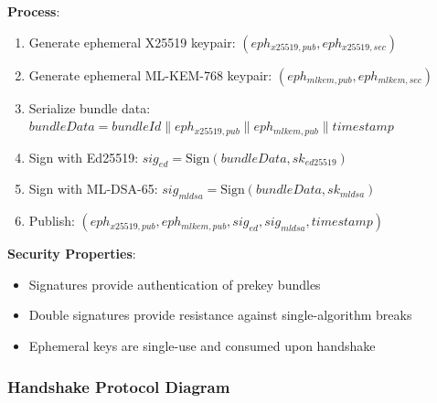 \documentclass[11pt,a4paper,oneside]{article}
\begin{document}
\textbf{Process}:
\begin{enumerate}
\item Generate ephemeral X25519 keypair: $(eph_{x25519,pub}, eph_{x25519,sec})$
\item Generate ephemeral ML-KEM-768 keypair: $(eph_{mlkem,pub}, eph_{mlkem,sec})$
\item Serialize bundle data: $bundleData = bundleId \| eph_{x25519,pub} \| eph_{mlkem,pub} \| timestamp$
\item Sign with Ed25519: $sig_{ed} = \text{Sign}(bundleData, sk_{ed25519})$
\item Sign with ML-DSA-65: $sig_{mldsa} = \text{Sign}(bundleData, sk_{mldsa})$
\item Publish: $(eph_{x25519,pub}, eph_{mlkem,pub}, sig_{ed}, sig_{mldsa}, timestamp)$
\end{enumerate}

\textbf{Security Properties}:
\begin{itemize}
\item Signatures provide authentication of prekey bundles
\item Double signatures provide resistance against single-algorithm breaks
\item Ephemeral keys are single-use and consumed upon handshake
\end{itemize}

\subsubsection{Handshake Protocol Diagram}
\end{document}
